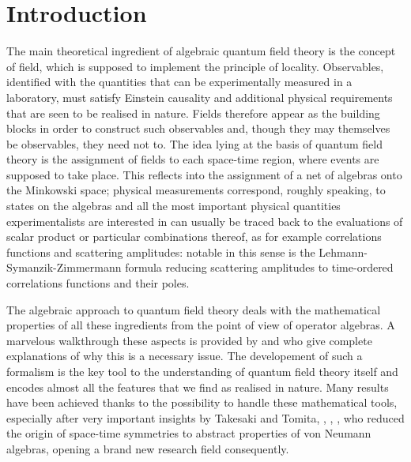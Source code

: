 \begingroup
\let\clearpage\relax
\let\cleardoublepage\relax
\let\cleardoublepage\relax

 \chapter*{Introduction}
 The main theoretical ingredient of algebraic quantum field
 theory is the concept of field, which is supposed to
 implement the principle of locality. Observables, identified
 with the quantities that can be experimentally measured in a 
 laboratory, must satisfy Einstein causality and additional
 physical requirements that are seen to be realised in 
 nature. Fields therefore appear as the building blocks
 in order to construct such observables and, though they
 may themselves be observables, they need not to. The idea 
 lying at the basis of quantum field theory is the 
 assignment of fields to each space-time region, where
 events are supposed to take place. This reflects into 
 the assignment of a net of algebras onto the Minkowski
 space; physical measurements correspond, roughly speaking,
 to states on the algebras and all the most important physical
 quantities experimentalists are interested in can usually
 be traced back to the evaluations of scalar product or 
 particular combinations thereof, as for example correlations
 functions and scattering amplitudes: notable in this 
 sense is the Lehmann-Symanzik-Zimmermann formula reducing 
 scattering amplitudes to time-ordered correlations functions
 and their poles.
 
 The algebraic approach to quantum field theory deals with
 the mathematical properties of all these ingredients 
 from the point of view of operator algebras. 
 A marvelous walkthrough these aspects is provided by 
 \cite{Haag} and \cite{roberts:2004} who give complete
 explanations of why this is a necessary issue. The developement
 of such a formalism is the key tool to the understanding of
 quantum field theory itself and encodes almost all the 
 features that we find as realised in nature. Many results
 have been achieved thanks to the possibility to handle 
 these mathematical tools, especially after very important
 insights by Takesaki and Tomita, \cite{Borchers:1999},
 \cite{Tak:1970}, \cite{TAKII:2002}, who reduced the origin
 of space-time symmetries to abstract properties of von 
 Neumann algebras, opening a brand new research field
 consequently.
 
